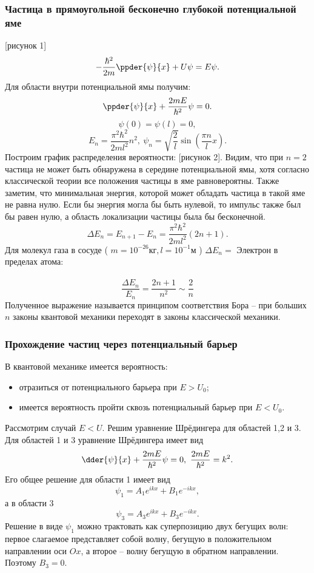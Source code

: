 \subsubsection{Частица в прямоугольной бесконечно глубокой потенциальной яме}
[рисунок 1]
\begin{equation}
    -\frac{\hbar^2}{2m}\ppder{\psi}{x} + U\psi = E\psi.
\end{equation}
Для области внутри потенциальной ямы получим:
\begin{equation}
    \ppder{\psi}{x} + \frac{2mE}{\hbar^2}\psi = 0.
\end{equation}
\[ \psi(0) = \psi(l) = 0, \]
\begin{equation}
    E_n = \frac{\pi^2\hbar^2}{2ml^2}n^2,\ 
    \psi_n = \sqrt{\frac{2}{l}}\sin(\frac{\pi n}{l}x).
\end{equation}
Построим график распределения вероятности: [рисунок 2]. Видим, что при \(n=2\)
частица не может быть обнаружена в середине потенциальной ямы, хотя согласно
классической теории все положения частицы в яме равновероятны. Также заметим,
что минимальная энергия, которой может обладать частица в такой яме не равна
нулю. Если бы энергия могла бы быть нулевой, то импульс также был бы равен нулю,
а область локализации частицы была бы бесконечной.
\[
    \Delta E_n = E_{n+1} - E_n = \frac{\pi^2\hbar^2}{2ml^2}(2n+1).
\]
Для молекул газа в сосуде ( \( m = 10^{-26}\text{кг}, l = 10^{-1}\text{м} \) )
\( \Delta E_n =  \)
Электрон в пределах атома: \\ \\
\[
    \frac{\Delta E_n}{E_n} = \frac{2n+1}{n^2} \sim \frac{2}{n}
\]
Полученное выражение называется принципом соответствия Бора -- при больших
\( n \) законы квантовой механики переходят в законы классической механики.

\subsubsection{Прохождение частиц через потенциальный барьер}
В квантовой механике имеется вероятность:
\begin{itemize}
    \item отразиться от потенциального барьера при \( E > U_0 \);
    \item имеется вероятность пройти сквозь потенциальный барьер при
    \( E < U_0 \).
\end{itemize}

Рассмотрим случай \( E < U \). Решим уравнение Шрёдингера для областей 1,2 и 3.
Для областей 1 и 3 уравнение Шрёдингера имеет вид
\[
    \dder{\psi}{x} + \frac{2mE}{\hbar^2}\psi = 0,\ \frac{2mE}{\hbar^2} = k^2.
\] 
Его общее решение для области 1 имеет вид
\[
    \psi_1 = A_1 e^{ikx} + B_1 e^{-ikx},
\]
а в области 3
\[
    \psi_3 = A_3 e^{ikx} + B_3 e^{-ikx}.
\]
Решение в виде \( \psi_1 \) можно трактовать как суперпозицию двух бегущих волн:
первое слагаемое представляет собой волну, бегущую в положительном направлении
оси \( Ox \), а второе -- волну бегущую в обратном направлении. Поэтому
\( B_3 = 0 \).

